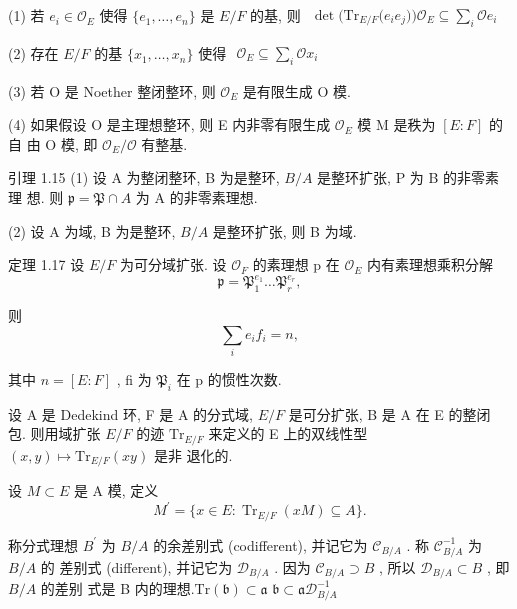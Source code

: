 \documentclass[]{article}
\begin{document}
{(1) 若 $e _ { i } \in { \mathcal { O } } _ { E }$ 使得 $\{ e _ { 1 } , \ldots , e _ { n } \}$ 是 $E / F$ 的基, 则 $\begin{array} { r } { \operatorname* { d e t } \bigl ( \mathrm { T r } _ { E / F } \bigl ( e _ { i } e _ { j } \bigr ) \bigr ) \mathcal { O } _ { E } \subseteq \sum _ { i } \mathcal { O } e _ { i } } \end{array}$ 

(2) 存在 $E / F$ 的基 $\{ x _ { 1 } , \ldots , x _ { n } \}$ 使得 $\begin{array} { r } { \mathcal { O } _ { E } \subseteq \sum _ { i } \mathcal { O } x _ { i } } \end{array}$ 

(3) 若 O 是 Noether 整闭整环, 则 $\mathcal { O } _ { E }$ 是有限生成 O 模. 

(4) 如果假设 O 是主理想整环, 则 E 内非零有限生成 $\mathcal { O } _ { E }$ 模 M 是秩为 $[ E : F ]$ 的 自 由 O 模, 即 $\mathcal { O } _ { E } / \mathcal { O }$ 有整基. 

引理 1.15 (1) 设 A 为整闭整环, B 为是整环, $B / A$ 是整环扩张, P 为 B 的非零素理 想. 则 ${ \mathfrak { p } } = { \mathfrak { P } } \cap A$ 为 A 的非零素理想. 

(2) 设 A 为域, B 为是整环, $B / A$ 是整环扩张, 则 B 为域. 

定理 1.17 设 $E / F$ 为可分域扩张. 设 ${ \mathcal { O } } _ { F }$ 的素理想 p 在 $\mathcal { O } _ { E }$ 内有素理想乘积分解 $$
\mathfrak {p} = \mathfrak {P} _ {1} ^ {e _ {1}} \dots \mathfrak {P} _ {r} ^ {e _ {r}},
$$

则 $$
\sum_ {i} e _ {i} f _ {i} = n,
$$

其中 $n = [ E : F ]$ , fi 为 ${ \mathfrak { P } } _ { i }$ 在 p 的惯性次数. 

设 A 是 Dedekind 环, F 是 A 的分式域, $E / F$ 是可分扩张, B 是 A 在 E 的整闭 包. 则用域扩张 $E / F$ 的迹 $\mathrm { T r } _ { E / F }$ 来定义的 E 上的双线性型 $( x , y ) \mapsto \mathrm { T r } _ { E / F } ( x y )$ 是非 退化的. 

设 $M \subset E$ 是 A 模, 定义$$
M ^ {\prime} = \{x \in E: \operatorname{Tr} _ {E / F} (x M) \subseteq A \}.
$$

称分式理想 $B ^ { \prime }$ 为 $B / A$ 的余差别式 (codifferent), 并记它为 $\mathcal { C } _ { B / A }$ . 称 $ { \mathcal { C } } _ { B / A } ^ { - 1 }$ 为 $B / A$ 的 差别式 (different), 并记它为 $\mathcal { D } _ { B / A }$ . 因为 $\mathcal { C } _ { B / A } \supset B$ , 所以 $\mathcal { D } _ { B / A } \subset B$ , 即 $B / A$ 的差别 式是 B 内的理想.${ \mathrm { T r } } ( { \mathfrak { b } } ) \subset { \mathfrak { a } }$ $\mathfrak { b } \subset \mathfrak { a } \mathcal { D } _ { B / A } ^ { - 1 }$ 

}
\end{document}
